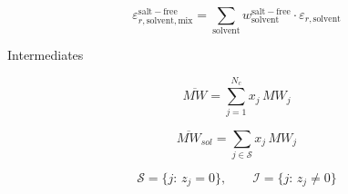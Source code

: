 \documentclass[12pt, letterpaper]{article}
\begin{document}

\begin{equation}
    \varepsilon_{r,\mathrm{solvent,mix}}^{\mathrm{salt-free}}=\sum_{\mathrm{solvent}}w_{\mathrm{solvent}}^{\mathrm{salt-free}}\cdot\varepsilon_{r,\mathrm{solvent}}
    \label{eq:epsr_salt_free}
\end{equation}


Intermediates


\begin{equation}
    \overline{MW}=\sum_{j=1}^{N_{c}} x_{j}\,MW_{j}
    \label{eq:mw_bar}
\end{equation}


\begin{equation}
    \overline{MW}_{sol}=\sum_{j\in\mathcal S}x_{j}\,MW_{j}
    \label{eq:mw_solvent_bar}
\end{equation}


\begin{equation}
    \mathcal S=\{j:\,z_{j}=0\},\qquad \mathcal I=\{j:\,z_{j}\neq 0\}
    \label{eq:solvent_ion_sets}
\end{equation}

\end{document}
